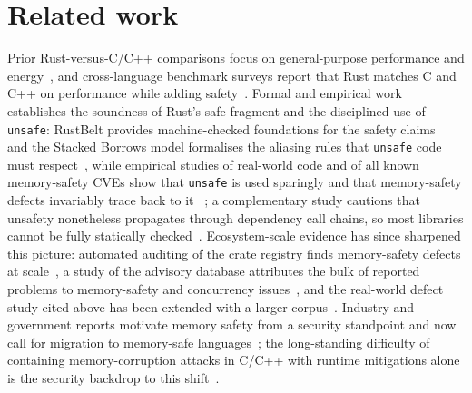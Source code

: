\documentclass[english,twoside,openright,a4paper,censored,csm,software-track-2020]{HYthesisML}
\begin{document}
\section{Related work}
Prior Rust-versus-C/C++ comparisons focus on general-purpose performance and
energy~\cite{pereira2017energy}, and cross-language benchmark surveys report that Rust matches
C and C++ on performance while adding safety~\cite{bugden2022rust}. Formal and empirical work establishes the soundness of
Rust's safe fragment and the disciplined use of \texttt{unsafe}: RustBelt provides
machine-checked foundations for the safety claims~\cite{jung2018rustbelt,jung2021safe} and the
Stacked Borrows model formalises the aliasing rules that \texttt{unsafe} code must
respect~\cite{jung2020stacked}, while
empirical studies of real-world code and of all known memory-safety CVEs show that
\texttt{unsafe} is used sparingly and that memory-safety defects invariably trace back to it
~\cite{astrauskas2020unsafe,qin2020rust,xu2021rustcve}; a complementary study cautions that
unsafety nonetheless propagates through dependency call chains, so most libraries cannot be
fully statically checked~\cite{evans2020rust}. Ecosystem-scale evidence has since sharpened
this picture: automated auditing of the crate registry finds memory-safety defects at
scale~\cite{bae2021rudra}, a study of the advisory database attributes the bulk of reported
problems to memory-safety and concurrency issues~\cite{zheng2024security}, and the real-world
defect study cited above has been extended with a larger corpus~\cite{qin2024safety}. Industry
and government reports motivate memory
safety from a security standpoint and now call for migration to memory-safe
languages~\cite{msrc2019memory,google2022android,cisa2023memorysafe,oncd2024building,google2024securebydesign};
the long-standing difficulty of containing memory-corruption attacks in C/C++ with runtime
mitigations alone is the security backdrop to this shift~\cite{szekeres2013sok}.
\end{document}
